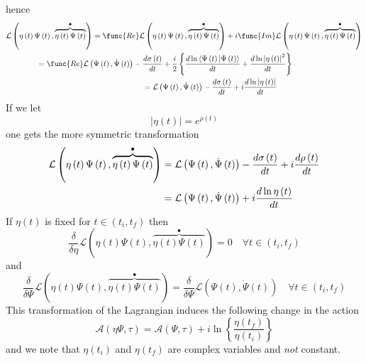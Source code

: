 \documentclass[aps,preprint]{revtex4}
\begin{document}
hence%
\begin{align}
& \mathcal{L}\left( \eta\left( t\right) \Psi\left( t\right) ,\overset{\bullet%
}{\overbrace{\eta\left( t\right) \Psi\left( t\right) }}\right) =\func{Re}%
\mathcal{L}\left( \eta\left( t\right) \Psi\left( t\right) ,\overset{\bullet}{%
\overbrace{\eta\left( t\right) \Psi\left( t\right) }}\right) +i\func{Im}%
\mathcal{L}\left( \eta\left( t\right) \Psi\left( t\right) ,\overset{\bullet}{%
\overbrace {\eta\left( t\right) \Psi\left( t\right) }}\right)  \notag \\
& \qquad\qquad\left. =\right. \func{Re}\mathcal{L}\left( \Psi\left( t\right)
,\dot{\Psi}\left( t\right) \right) -\frac {d\sigma\left( t\right) }{dt}+%
\frac{i}{2}\left\{ \frac{d\ln\left\langle \Psi\left( t\right) |\Psi\left(
t\right) \right\rangle }{dt}+\frac {d\ln\left| \eta\left( t\right) \right|
^{2}}{dt}\right\}  \notag \\
& \qquad\qquad\qquad\qquad\qquad\qquad\qquad\qquad\qquad\left. =\right. 
\mathcal{L}\left( \Psi\left( t\right) ,\dot{\Psi}\left( t\right) \right) -%
\frac{d\sigma\left( t\right) }{dt}+i\frac{d\ln\left| \eta\left( t\right)
\right| }{dt}
\end{align}
If we let 
\begin{equation}
\left| \eta\left( t\right) \right| =e^{\rho\left( t\right) }
\end{equation}
one gets the more symmetric transformation%
\begin{align}
\mathcal{L}\left( \eta\left( t\right) \Psi\left( t\right) ,\overset{\bullet}{%
\overbrace{\eta\left( t\right) \Psi\left( t\right) }}\right) & =\mathcal{L}%
\left( \Psi\left( t\right) ,\dot{\Psi}\left( t\right) \right) -\frac{%
d\sigma\left( t\right) }{dt}+i\frac{d\rho\left( t\right) }{dt}  \notag \\
& =\mathcal{L}\left( \Psi\left( t\right) ,\dot{\Psi}\left( t\right) \right)
+i\frac{d\ln\eta\left( t\right) }{dt}  \label{Ltrans}
\end{align}
If $\eta\left( t\right) $ is fixed for $t\in\left( t_{i},t_{f}\right) $ then 
\begin{equation}
\frac{\delta}{\delta\eta}\mathcal{L}\left( \eta\left( t\right) \Psi\left(
t\right) ,\overset{\bullet}{\overbrace{\eta\left( t\right) \Psi\left(
t\right) }}\right) =0\quad\forall t\in\left( t_{i},t_{f}\right)
\end{equation}
and 
\begin{equation}
\frac{\delta}{\delta\Psi}\mathcal{L}\left( \eta\left( t\right) \Psi\left(
t\right) ,\overset{\bullet}{\overbrace{\eta\left( t\right) \Psi\left(
t\right) }}\right) =\frac{\delta}{\delta\Psi}\mathcal{L}\left( \Psi\left(
t\right) ,\dot{\Psi}\left( t\right) \right) \quad\forall t\in\left(
t_{i},t_{f}\right)  \label{inv}
\end{equation}
This transformation of the Lagrangian induces the following change in the
action%
\begin{equation}
\mathcal{A}\left( \eta\Psi,\tau\right) =\mathcal{A}\left( \Psi,\tau\right)
+i\ln\left\{ \frac{\eta\left( t_{f}\right) }{\eta\left( t_{i}\right) }%
\right\}
\end{equation}
and we note that $\eta\left( t_{i}\right) $ and $\eta\left( t_{f}\right) $
are complex variables and \emph{not} constant.
\end{document}
